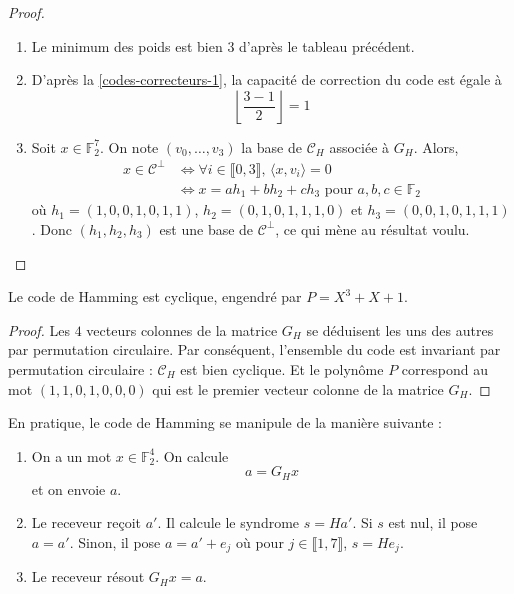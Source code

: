 	\begin{proof}
		\begin{enumerate}[label=(\roman*)]
			\item Le minimum des poids est bien $3$ d'après le tableau précédent.
			\item D'après la \cref{codes-correcteurs-1}, la capacité de correction du code est égale à
			\[ \left\lfloor \frac{3-1}{2} \right\rfloor = 1 \]
			\item Soit $x \in \mathbb{F}_2^7$. On note $(v_0, \dots, v_3)$ la base de $\mathcal{C}_H$ associée à $G_H$. Alors,
			\begin{align*}
				x \in \mathcal{C}^\perp &\iff \forall i \in \llbracket 0, 3 \rrbracket, \, \langle x, v_i \rangle = 0 \\
				&\iff x = ah_1 + bh_2 + ch_3 \text{ pour } a,b,c \in \mathbb{F}_2
			\end{align*}
			où $h_1 = (1,  0,  0,  1,  0,  1,  1)$, $h_2 = (0,  1,  0,  1,  1,  1,  0)$ et $h_3 = (0,  0,  1,  0,  1,  1,  1)$. Donc $(h_1, h_2, h_3)$ est une base de $\mathcal{C}^\perp$, ce qui mène au résultat voulu.
		\end{enumerate}
	\end{proof}
	
	\begin{proposition}
		Le code de Hamming est cyclique, engendré par $P = X^3 + X + 1$.
	\end{proposition}
	
	\begin{proof}
		Les $4$ vecteurs colonnes de la matrice $G_H$ se déduisent les uns des autres par permutation circulaire. Par conséquent, l'ensemble du code est invariant par permutation circulaire : $\mathcal{C}_H$ est bien cyclique. Et le polynôme $P$ correspond au mot $(1, 1, 0, 1, 0, 0, 0)$ qui est le premier vecteur colonne de la matrice $G_H$.
	\end{proof}
	
	En pratique, le code de Hamming se manipule de la manière suivante :
	
	\begin{enumerate}
		\item On a un mot $x \in \mathbb{F}_2^4$. On calcule
		\[ a = G_H x \]
		et on envoie $a$.
		\item Le receveur reçoit $a'$. Il calcule le syndrome $s = Ha'$. Si $s$ est nul, il pose $a = a'$. Sinon, il pose $a = a' + e_j$ où pour $j \in \llbracket 1, 7 \rrbracket$, $s = He_j$.
		\item Le receveur résout $G_H x = a$.
	\end{enumerate}

